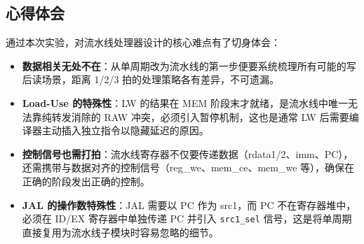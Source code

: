 \documentclass[12pt,hyperref,a4paper,UTF8]{ctexart}
\begin{document}
\subsection{心得体会}

通过本次实验，对流水线处理器设计的核心难点有了切身体会：

\begin{itemize}[leftmargin=2em]
    \item \textbf{数据相关无处不在}：从单周期改为流水线的第一步便要系统梳理所有可能的写后读场景，距离 1/2/3 拍的处理策略各有差异，不可遗漏。

    \item \textbf{Load-Use 的特殊性}：LW 的结果在 MEM 阶段末才就绪，是流水线中唯一无法靠纯转发消除的 RAW 冲突，必须引入暂停机制，这也是通常 LW 后需要编译器主动插入独立指令以隐藏延迟的原因。

    \item \textbf{控制信号也需打拍}：流水线寄存器不仅要传递数据（rdata1/2、imm、PC），还需携带与数据对齐的控制信号（reg\_we、mem\_ce、mem\_we 等），确保在正确的阶段发出正确的控制。

    \item \textbf{JAL 的操作数特殊性}：JAL 需要以 PC 作为 src1，而 PC 不在寄存器堆中，必须在 ID/EX 寄存器中单独传递 PC 并引入 \texttt{src1\_sel} 信号，这是将单周期直接复用为流水线子模块时容易忽略的细节。
\end{itemize}
\end{document}
